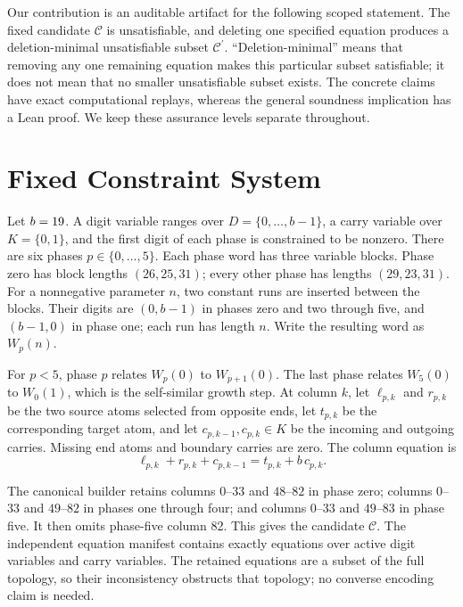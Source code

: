 \documentclass[11pt]{article}
\newcommand{\Ccandidate}{\ensuremath{\mathcal{C}}}
\newcommand{\Ccore}{\ensuremath{\mathcal{C}^{\prime}}}
\begin{document}
Our contribution is an auditable artifact for the following scoped
statement.  The fixed candidate \Ccandidate{} is unsatisfiable, and deleting
one specified equation produces a deletion-minimal unsatisfiable subset
\Ccore.  ``Deletion-minimal'' means that removing any one remaining equation
makes this particular subset satisfiable; it does not mean that no smaller
unsatisfiable subset exists.  The concrete claims have exact computational
replays, whereas the general soundness implication has a Lean proof.  We keep
these assurance levels separate throughout.

\section{Fixed Constraint System}

Let $b=19$.  A digit variable ranges over
$D=\{0,\ldots,b-1\}$, a carry variable over $K=\{0,1\}$, and the first
digit of each phase is constrained to be nonzero.  There are six phases
$p\in\{0,\ldots,5\}$.  Each phase word has three variable blocks.  Phase zero
has block lengths $(26,25,31)$; every other phase has lengths $(29,23,31)$.
For a nonnegative parameter $n$, two constant runs are inserted between the
blocks.  Their digits are $(0,b-1)$ in phases zero and two through five, and
$(b-1,0)$ in phase one; each run has length $n$.  Write the resulting word as
$W_p(n)$.

For $p<5$, phase $p$ relates $W_p(0)$ to $W_{p+1}(0)$.  The last phase
relates $W_5(0)$ to $W_0(1)$, which is the self-similar growth step.  At
column $k$, let $\ell_{p,k}$ and $r_{p,k}$ be the two source atoms selected
from opposite ends, let $t_{p,k}$ be the corresponding target atom, and let
$c_{p,k-1},c_{p,k}\in K$ be the incoming and outgoing carries.  Missing
end atoms and boundary carries are zero.  The column equation is
\begin{equation}\label{eq:column}
  \ell_{p,k}+r_{p,k}+c_{p,k-1}
  =t_{p,k}+b\,c_{p,k}.
\end{equation}

The canonical builder retains columns $0$--$33$ and $48$--$82$ in phase
zero; columns $0$--$33$ and $49$--$82$ in phases one through four; and
columns $0$--$33$ and $49$--$83$ in phase five.  It then omits phase-five
column 82.  This gives the candidate \Ccandidate.  The independent equation
manifest contains exactly \CandidateEquationCount{} equations over
\ActiveDigitCount{} active digit variables and \ActiveCarryCount{} carry
variables.  The retained equations are a subset of the full topology, so
their inconsistency obstructs that topology; no converse encoding claim is
needed.
\end{document}
